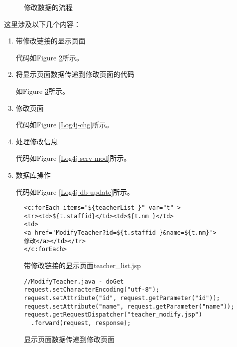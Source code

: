 \begin{figure}
\caption{修改数据的流程}
\label{Log4j-mod-pro}
\end{figure}

这里涉及以下几个内容：
\begin{enumerate}
\item
带修改链接的显示页面

代码如Figure \ref{Log4j-list-chg}所示。
\item
将显示页面数据传递到修改页面的代码

如Figure \ref{Log4j-lst-serv-chg}所示。
\item
修改页面

代码如Figure \ref{Log4j-chg}所示。
\item
处理修改信息

代码如Figure \ref{Log4j-serv-mod}所示。
\item
数据库操作

代码如Figure \ref{Log4j-db-update}所示。
\end{enumerate}

\begin{figure}
\begin{verbatim}
<c:forEach items="${teacherList }" var="t" >
<tr><td>${t.staffid}</td><td>${t.nm }</td>
<td>
<a href='ModifyTeacher?id=${t.staffid }&name=${t.nm}'>
修改</a></td></tr>
</c:forEach>
\end{verbatim}
\caption{带修改链接的显示页面teacher\_list.jsp}
\label{Log4j-list-chg}
\end{figure}

\begin{figure}
\begin{verbatim}
//ModifyTeacher.java - doGet
request.setCharacterEncoding("utf-8");
request.setAttribute("id", request.getParameter("id"));
request.setAttribute("name", request.getParameter("name"));
request.getRequestDispatcher("teacher_modify.jsp")
  .forward(request, response);
\end{verbatim}
\caption{显示页面数据传递到修改页面}
\label{Log4j-lst-serv-chg}
\end{figure}



